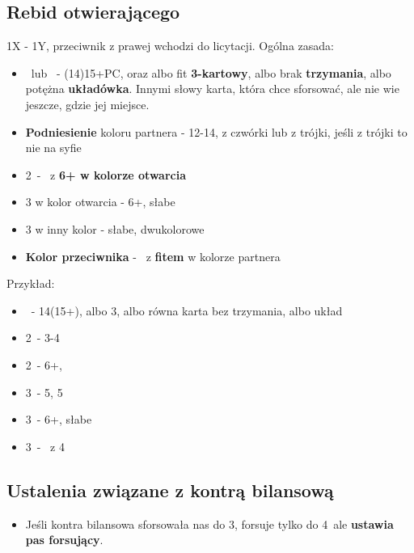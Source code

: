 \documentclass[12pt, a4paper]{article}
\begin{document}
\subsection{Rebid otwierającego}
1X - 1Y, przeciwnik z prawej wchodzi do licytacji.
Ogólna zasada:
\begin{itemize}
    \item \dbl\ lub \rdbl\ - (14)15+PC, oraz albo fit \textbf{3-kartowy}, albo brak \textbf{trzymania},
    albo potężna \textbf{układówka}. Innymi słowy karta,
    która chce sforsować, ale nie wie jeszcze, gdzie jej miejsce.

    \item \textbf{Podniesienie} koloru partnera - 12-14, z czwórki lub z trójki, jeśli z trójki to nie na syfie
    \item 2\nt\ - \inv\ z \textbf{6+ w kolorze otwarcia}
    \item 3 w kolor otwarcia - 6+, słabe
    \item 3 w inny kolor - słabe, dwukolorowe
    \item \textbf{Kolor przeciwnika} - \gf\ z \textbf{fitem} w kolorze partnera
\end{itemize}
Przykład:
\begin{itemize}
    \item \dbl\ - 14(15+), albo 3\spades, albo równa karta bez trzymania, albo układ
    \item 2\spades\ - 3-4\spades
    \item 2\nt\ - 6+\diams, \inv
    \item 3\clubs\ - 5\diams, 5\clubs
    \item 3\diams\ - 6+\diams, słabe
    \item 3\hearts\ - \gf\ z 4\spades
\end{itemize}

\subsection{Ustalenia związane z kontrą bilansową}
\begin{itemize}
    \item Jeśli kontra bilansowa sforsowała nas do 3\nt, forsuje tylko do 4\minor\, ale \textbf{ustawia pas forsujący}.
\end{itemize}



\pagebreak
\end{document}
